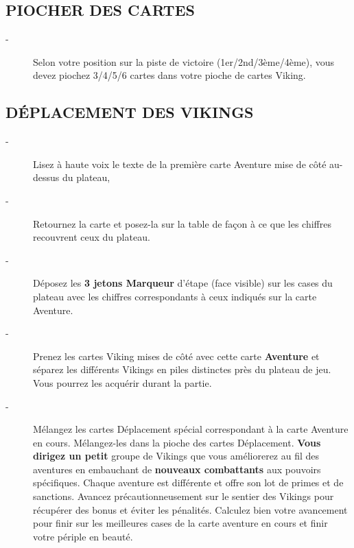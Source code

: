 \documentclass{scrartcl}%
\begin{document}
%
\subsection{ PIOCHER DES CARTES
}%
\label{subsec:PIOCHERDESCARTES}%
\begin{description}%
\item[{-} ]%
%
 Selon votre position sur la piste de victoire (1er/2nd/3ème/4ème), vous devez piochez 3/4/5/6 cartes dans votre pioche de cartes Viking.
%
\end{description}

%
\subsection{ DÉPLACEMENT DES VIKINGS
}%
\label{subsec:DPLACEMENTDESVIKINGS}%
\begin{description}%
\item[{-} ]%
%
 Lisez à haute voix le texte de la première carte Aventure mise de côté au{-}dessus du plateau,
%
\item[{-} ]%
%
 Retournez la carte et posez{-}la sur la table de façon à ce que les chiffres recouvrent ceux du plateau.
%
\item[{-} ]%
%
 Déposez les %
\textbf{3 jetons Marqueur}%
\textit{ }%
 d'étape (face visible) sur les cases du plateau avec les chiffres correspondants à ceux indiqués sur la carte Aventure.
%
\item[{-} ]%
%
 Prenez les cartes Viking mises de côté avec cette carte %
\textbf{Aventure}%
\textit{ }%
 et séparez les différents Vikings en piles distinctes près du plateau de jeu. Vous pourrez les acquérir durant la partie.
%
\item[{-} ]%
%
 Mélangez les cartes Déplacement spécial correspondant à la carte Aventure en cours. Mélangez{-}les dans la pioche des cartes Déplacement. %
\textbf{Vous dirigez un petit}%
\textit{ }%
 groupe de Vikings que vous améliorerez au fil des aventures en embauchant de%
\textbf{ nouveaux combattants}%
\textit{ }%
 aux pouvoirs spécifiques. Chaque aventure est différente et offre son lot de primes et de sanctions. Avancez précautionneusement sur le sentier des Vikings pour récupérer des bonus et éviter les pénalités. Calculez bien votre avancement pour finir sur les meilleures cases de la carte aventure en cours et finir votre périple en beauté.
%
\end{description}%
\end{document}
